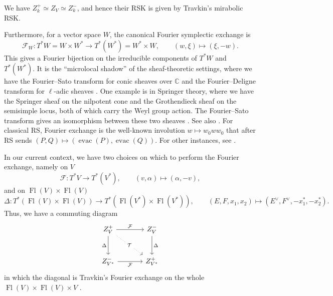 \documentclass[12pt,a4paper]{article}
\def\Fl{\operatorname{Fl}}
\def\FlVV{\Fl(V) \times \Fl(V)}
\def\evac{\operatorname{evac}}
\theoremstyle{plain}
\newenvironment{repthm}[1]
  {\renewcommand\theinnercustomthm{#1}\innercustomthm}
  {\endinnercustomthm}
\theoremstyle{definition}
\theoremstyle{remark}
\newcommand{\cF}{\mathcal{F}}
\newcommand{\CC}{\mathbb{C}}
\begin{document}
    \begin{repthm}{\ref{thm:Z+-}}
        We have $Z^+_k \simeq Z_V \simeq Z^-_k$, and hence their RSK is given by Travkin's mirabolic RSK.
    \end{repthm}

    Furthermore, for a vector space $W$, the canonical Fourier symplectic exchange is
    \[
    \cF_W:T^*W=W\times W^* \longrightarrow T^*(W^*)=W^*\times W,\qquad
    (w,\xi)\longmapsto(\xi,-w).
    \]
    This gives a Fourier bijection on the irreducible components of $T^*W$ and $T^*(W^*)$. It is the ``microlocal shadow'' of the sheaf-theoretic settings, where we have the Fourier--Sato transform for conic sheaves over $\CC$ \cite[Section 3.7]{kashiwara2013sheaves} and the Fourier--Deligne transform for $\ell$-adic sheaves \cite{laumon1987transformation, kiehl2001weil}. One  example is in Springer theory, where we have the Springer sheaf on the nilpotent cone and the Grothendieck sheaf on the semisimple locus, both of which carry the Weyl group action. The Fourier--Sato transform gives an isomorphism between these two sheaves \cite[Lemma 2.2]{achar2014weyl}. See also \cite{brylinski1982transformations, lusztig2010introduction, tamarkin2013microlocal, d2018microlocal}. For classical RS, Fourier exchange is the well-known involution $w\mapsto w_0ww_0$ that after RS sends $(P,Q)\mapsto (\evac(P),\evac(Q))$. For other instances, see \cite{travkin2009mirabolic, finkelberg2025lagrangian}.

    In our current context, we have two choices on which to perform the Fourier exchange, namely on $V$
    \[
    \cF:T^*V \longrightarrow T^*(V^*),\qquad
    (v,\alpha)\longmapsto(\alpha,-v),
    \]
    and on $\FlVV$
    \[
    \Delta : T^*(\FlVV) \longrightarrow T^*(\Fl(V^*) \times \Fl(V^*)), \qquad (E,F,x_1,x_2) \mapsto (E^\vee,F^\vee,-x_1^*,-x_2^*).
    \]
    Thus, we have a commuting diagram
    \[\begin{tikzcd}[sep = scriptsize]
    	{Z^+_V} && {Z^-_V} \\
    	\\
    	{Z^-_{V^*}} && {Z^+_{V^*}}
    	\arrow["{\cF}", from=1-1, to=1-3]
    	\arrow["\Delta"', from=1-1, to=3-1]
    	\arrow["\Delta", from=1-3, to=3-3]
    	\arrow["{\cF}"', from=3-1, to=3-3]
        \arrow["{\mathcal{T}}"{description}, dotted, from=1-1, to=3-3]
    \end{tikzcd}\]
    in which the diagonal is Travkin's Fourier exchange on the whole $\FlVV \times V$ \cite[Section 5.3]{travkin2009mirabolic}.
\end{document}
